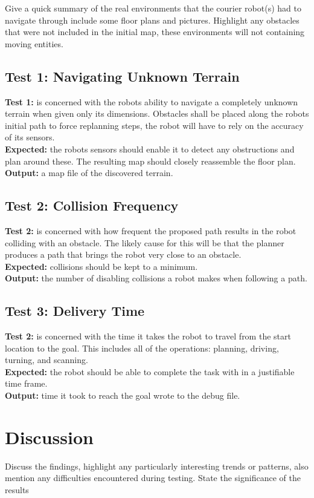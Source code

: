 Give a quick summary of the real environments that the courier robot(s) had to navigate through include some floor plans and pictures. Highlight any obstacles that were not included in the initial map, these environments will not containing moving entities.

\subsection{Test 1: Navigating Unknown Terrain}

\noindent
\textbf{Test 1:} is concerned with the robots ability to navigate a completely unknown terrain when given only its dimensions. Obstacles shall be placed along the robots initial path to force replanning steps, the robot will have to rely on the accuracy of its sensors.\\

\noindent
\textbf{Expected:} the robots sensors should enable it to detect any obstructions and plan around these. The resulting map should closely reassemble the floor plan.\\

\noindent
\textbf{Output:} a map file of the discovered terrain.

\subsection{Test 2: Collision Frequency}

\noindent
\textbf{Test 2:} is concerned with how frequent the proposed path results in the robot colliding with an obstacle. The likely cause for this will be that the planner produces a path that brings the robot very close to an obstacle.\\

\noindent
\textbf{Expected:} collisions should be kept to a minimum.\\

\noindent
\textbf{Output:} the number of disabling collisions a robot makes when following a path.

\subsection{Test 3: Delivery Time}

\noindent
\textbf{Test 2:} is concerned with the time it takes the robot to travel from the start location to the goal. This includes all of the operations: planning, driving, turning, and scanning.\\

\noindent
\textbf{Expected:} the robot should be able to complete the task with in a justifiable time frame.\\

\noindent
\textbf{Output:} time it took to reach the goal wrote to the debug file.

\section{Discussion}
Discuss the findings, highlight any particularly interesting trends or patterns, also mention any difficulties encountered during testing. State the significance of the results